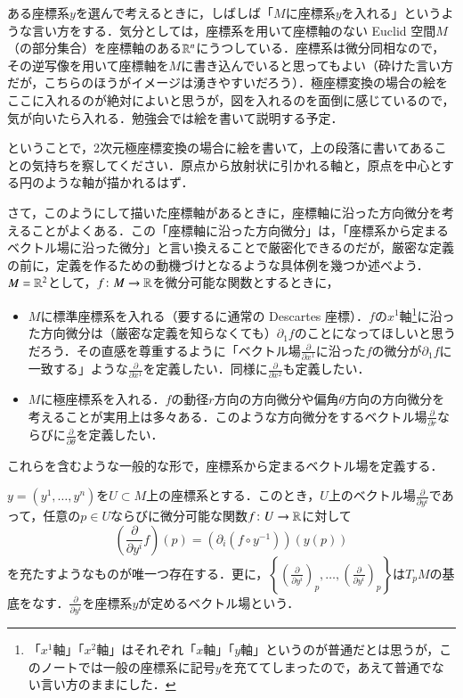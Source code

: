 ある座標系$y$を選んで考えるときに，しばしば「$M$に座標系$y$を入れる」というような言い方をする．気分としては，座標系を用いて座標軸のない Euclid 空間$M$（の部分集合）を座標軸のある$\mathbb{R}^n$にうつしている．座標系は微分同相なので，その逆写像を用いて座標軸を$M$に書き込んでいると思ってもよい（砕けた言い方だが，こちらのほうがイメージは湧きやすいだろう）．極座標変換の場合の絵をここに入れるのが絶対によいと思うが，図を入れるのを面倒に感じているので，気が向いたら入れる．勉強会では絵を書いて説明する予定．

\begin{que}
ということで，2次元極座標変換の場合に絵を書いて，上の段落に書いてあることの気持ちを察してください．原点から放射状に引かれる軸と，原点を中心とする円のような軸が描かれるはず．
\end{que}

さて，このようにして描いた座標軸があるときに，座標軸に沿った方向微分を考えることがよくある．この「座標軸に沿った方向微分」は，「座標系から定まるベクトル場に沿った微分」と言い換えることで厳密化できるのだが，厳密な定義の前に，定義を作るための動機づけとなるような具体例を幾つか述べよう．$M=\mathbb{R}^2$として，$f \colon M \to \mathbb{R}$を微分可能な関数とするときに，
\begin{itemize}
\item $M$に標準座標系を入れる（要するに通常の Descartes 座標）．$f$の$x^1$軸\footnote{「$x^1$軸」「$x^2$軸」はそれぞれ「$x$軸」「$y$軸」というのが普通だとは思うが，このノートでは一般の座標系に記号$y$を充ててしまったので，あえて普通でない言い方のままにした．}に沿った方向微分は（厳密な定義を知らなくても）$\partial_1 f$のことになってほしいと思うだろう．その直感を尊重するように「ベクトル場$\frac{\partial}{\partial x^1}$に沿った$f$の微分が$\partial_1 f$に一致する」ような$\frac{\partial}{\partial x^1}$を定義したい．同様に$\frac{\partial}{\partial x^2}$も定義したい．
\item $M$に極座標系を入れる．$f$の動径$r$方向の方向微分や偏角$\theta$方向の方向微分を考えることが実用上は多々ある．このような方向微分をするベクトル場$\frac{\partial}{\partial r}$ならびに$\frac{\partial}{\partial \theta}$を定義したい．
\end{itemize}

これらを含むような一般的な形で，座標系から定まるベクトル場を定義する．
\begin{prop}
$y=(y^1, \dots, y^n)$を$U \subset M$上の座標系とする．このとき，$U$上のベクトル場$\frac{\partial}{\partial y^i}$であって，任意の$p \in U$ならびに微分可能な関数$f \colon U \to \mathbb{R}$に対して
\begin{equation}
\left( \frac{\partial}{\partial y^i} f \right)(p) = \left(\partial_i (f \circ y^{-1}) \right) (y(p))
\end{equation}を充たすようなものが唯一つ存在する．更に，$\left\{ \left(\frac{\partial}{\partial y^i}\right)_p,\dots, \left(\frac{\partial}{\partial y^i}\right)_p \right\}$は$T_pM$の基底をなす．$\frac{\partial}{\partial y^i}$を座標系$y$が定めるベクトル場という．
\end{prop}

